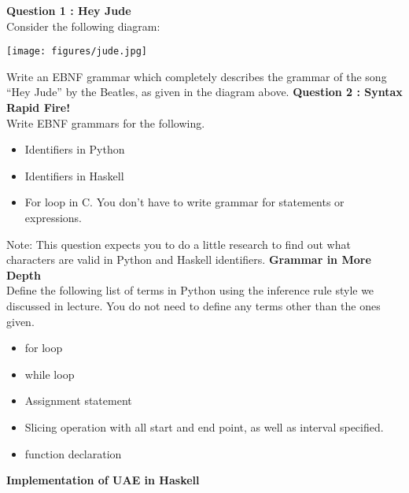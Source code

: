 \documentclass{exam}
\begin{document}
\begin{center}
\end{center}

\begin{questions}
\question[4] \textbf{Question 1 : Hey Jude} \\
Consider the following diagram: \\
\begin{center}
\texttt{[image: figures/jude.jpg]}
\end{center}
Write an EBNF grammar which completely describes the grammar of the song ``Hey Jude'' by the Beatles, as given in the diagram above.  
\question[6] \textbf{Question 2 : Syntax Rapid Fire!} \\
Write EBNF grammars for the following.
\begin{itemize}
\item Identifiers in Python
\item Identifiers in Haskell
\item For loop in C. You don't have to write grammar for statements or expressions.  
\end{itemize}
Note: This question expects you to do a little research to find out what characters are valid in Python and Haskell identifiers.  
\question[10] \textbf{Grammar in More Depth} \\
Define the following list of terms in Python using the inference rule style we discussed in lecture.  You do not need to define any terms other than the ones given.
\begin{itemize}
\item for loop
\item while loop
\item Assignment statement
\item Slicing operation with all start and end point, as well as interval specified.
\item function declaration
\end{itemize}
\question \textbf{Implementation of UAE in Haskell} \\
\end{questions}
\end{document}
